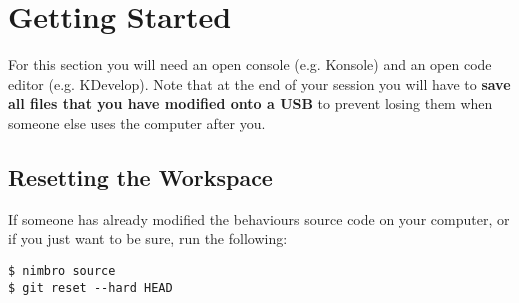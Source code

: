 \documentclass[runningheads,a4paper,obeyspaces]{llncs}
\begin{document}
%
\section{Getting Started}\label{sec:gettingstarted}

For this section you will need an open console (e.g. Konsole) and an open code
editor (e.g. KDevelop). Note that at the end of your session you will have to
\textbf{save all files that you have modified onto a USB} to prevent losing them
when someone else uses the computer after you.

\subsection{Resetting the Workspace}
If someone has already modified the behaviours source code on your computer, or
if you just want to be sure, run the following:
\begin{verbatim}
$ nimbro source
$ git reset --hard HEAD
\end{verbatim}
\end{document}
